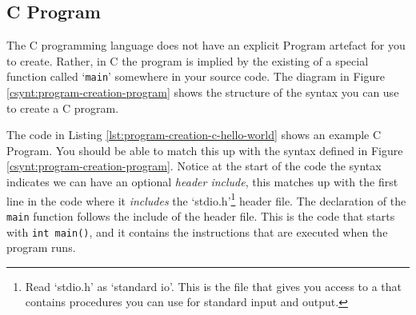 \clearpage
\subsection{C Program} %
\label{sub:program_in_c}

The C programming language does not have an explicit Program artefact for you to create. Rather, in C the program is implied by the existing of a special function called `\texttt{main}' somewhere in your source code. The diagram in Figure \ref{csynt:program-creation-program} shows the structure of the syntax you can use to create a C program.


The code in Listing \ref{lst:program-creation-c-hello-world} shows an example C Program. You should be able to match this up with the syntax defined in Figure \ref{csynt:program-creation-program}. Notice at the start of the code the syntax indicates we can have an optional \emph{header include}, this matches up with the first line in the code where it \emph{includes} the `stdio.h'\footnote{Read `stdio.h' as `standard io'. This is the file that gives you access to a  that contains procedures you can use for standard input and output.} header file. The declaration of the \texttt{main} function follows the include of the header file. This is the code that starts with \texttt{int main()}, and it contains the instructions that are executed when the program runs.



